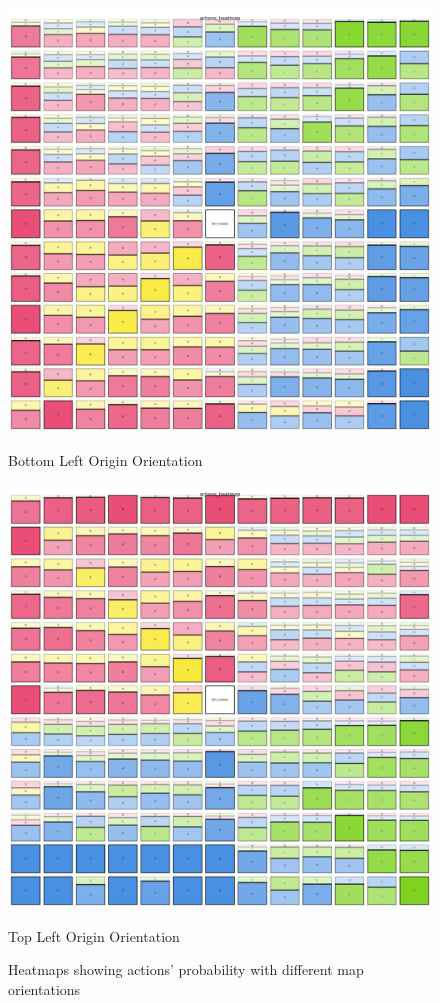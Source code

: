 \begin{figure}[ht]
  \centering
  \begin{minipage}[b]{0.45\textwidth}
    \centering
    \includegraphics[width=\textwidth]{
      images/results_discussion/actions_heatmapBL.png
    }
    \caption{Bottom Left Origin Orientation}
    \label{fig:heatmapBL}
  \end{minipage}
  \hfill
  \begin{minipage}[b]{0.45\textwidth}
    \centering
    \includegraphics[width=\textwidth]{
      images/results_discussion/actions_heatmapTL.png
    }
    \caption{Top Left Origin Orientation}
    \label{fig:heatmapTL}
  \end{minipage}
  \caption{Heatmaps showing actions' probability with different map orientations}
  \label{fig:orientation}
\end{figure}

